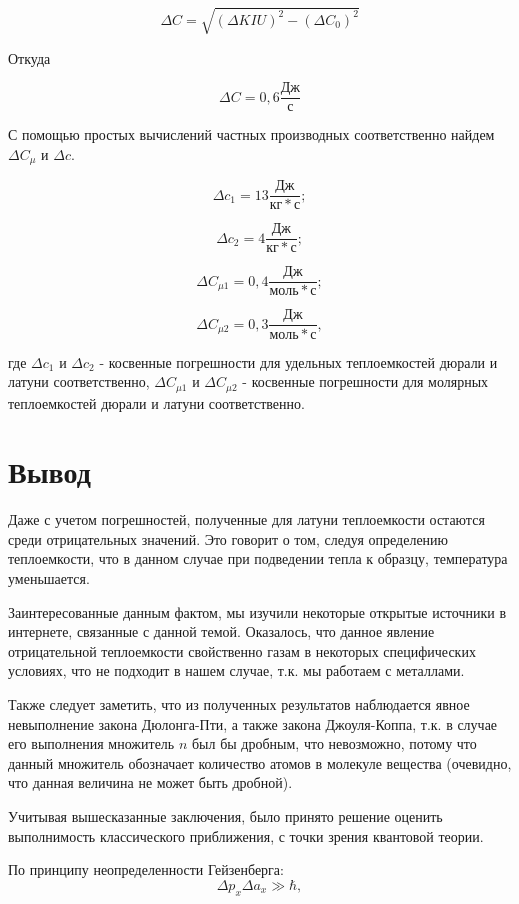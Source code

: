 \documentclass[a4paper,12pt]{article}
\begin{document}
$$\Delta C = \sqrt{(\Delta KIU)^2-(\Delta C_0)^2}$$

\hspace{\parindent}Откуда

$$\Delta C = 0,6\frac{Дж}{с}$$

\hspace{\parindent}С помощью простых вычислений частных производных соответственно найдем $\Delta C_\mu$ и $\Delta c$.

$$\Delta c_1 = 13 \frac{Дж}{кг*с};$$

$$\Delta c_2 = 4 \frac{Дж}{кг*с};$$

$$\Delta C_{\mu1} = 0,4 \frac{Дж}{моль*с};$$

$$\Delta C_{\mu2} = 0,3 \frac{Дж}{моль*с},$$

где $\Delta c_1$ и $\Delta c_2$ - косвенные погрешности для удельных теплоемкостей дюрали и латуни соответственно, $\Delta C_{\mu1}$ и $\Delta C_{\mu2}$ - косвенные погрешности для молярных теплоемкостей дюрали и латуни соответственно.

\newpage
\section{Вывод}
\hspace{\parindent}Даже с учетом погрешностей, полученные для латуни теплоемкости остаются среди отрицательных значений. Это говорит о том, следуя определению теплоемкости, что в данном случае при подведении тепла к образцу, температура уменьшается.

Заинтересованные данным фактом, мы изучили некоторые открытые источники в интернете, связанные с данной темой. Оказалось, что данное явление отрицательной теплоемкости свойственно газам в некоторых специфических условиях, что не подходит в нашем случае, т.к. мы работаем с металлами.

Также следует заметить, что из полученных результатов наблюдается явное невыполнение закона Дюлонга-Пти, а также закона Джоуля-Коппа, т.к. в случае его выполнения множитель $n$ был бы дробным, что невозможно, потому что данный множитель обозначает количество атомов в молекуле вещества (очевидно, что данная величина не может быть дробной).

Учитывая вышесказанные заключения, было принято решение оценить выполнимость классического приближения, с точки зрения квантовой теории.

\hspace{\parindent}По принципу неопределенности Гейзенберга:
$$\Delta p_x \Delta a_x \gg \hbar,$$
\end{document}
